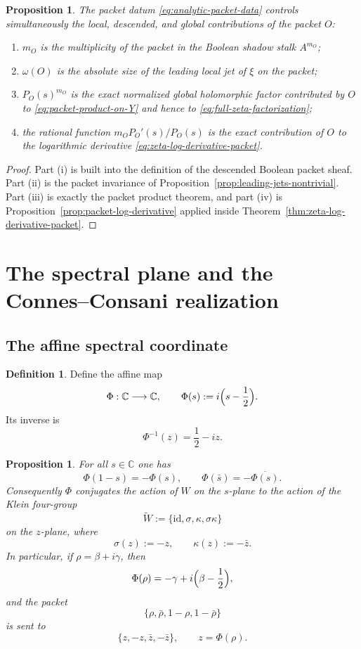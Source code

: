 \documentclass[11pt,a4paper]{article}
\numberwithin{equation}{section}
\newtheorem{proposition}[theorem]{Proposition}
\theoremstyle{definition}
\newtheorem{definition}[theorem]{Definition}
\theoremstyle{remark}
\newcommand{\CC}{\mathbb C}
\begin{document}
\begin{proposition}\label{prop:analytic-packet-data-complete}
The packet datum \eqref{eq:analytic-packet-data} controls simultaneously the local, descended, and global contributions of the packet $O$:
\begin{enumerate}[label=(\roman*)]
\item $m_O$ is the multiplicity of the packet in the Boolean shadow stalk $A^{m_O}$;
\item $\omega(O)$ is the absolute size of the leading local jet of $\xi$ on the packet;
\item $P_O(s)^{m_O}$ is the exact normalized global holomorphic factor contributed by $O$ to \eqref{eq:packet-product-on-Y} and hence to \eqref{eq:full-zeta-factorization};
\item the rational function $m_O P_O'(s)/P_O(s)$ is the exact contribution of $O$ to the logarithmic derivative \eqref{eq:zeta-log-derivative-packet}.
\end{enumerate}
\end{proposition}

\begin{proof}
Part (i) is built into the definition of the descended Boolean packet sheaf.  Part (ii) is the packet invariance of Proposition~\ref{prop:leading-jets-nontrivial}.  Part (iii) is exactly the packet product theorem, and part (iv) is Proposition~\ref{prop:packet-log-derivative} applied inside Theorem~\ref{thm:zeta-log-derivative-packet}.
\end{proof}

\section{The spectral plane and the Connes--Consani realization}

\subsection{The affine spectral coordinate}

\begin{definition}
Define the affine map
\[
\Phi:\CC\longrightarrow\CC,
\qquad
\Phi(s):=i\Bigl(s-\frac12\Bigr).
\]
Its inverse is
\[
\Phi^{-1}(z)=\frac12-iz.
\]
\end{definition}

\begin{proposition}\label{prop:Phi-symmetry}
For all $s\in\CC$ one has
\[
\Phi(1-s)=-\Phi(s),
\qquad
\Phi(\bar s)=-\overline{\Phi(s)}.
\]
Consequently $\Phi$ conjugates the action of $W$ on the $s$-plane to the action of the Klein four-group
\[
\widetilde W:=\{\mathrm{id},\sigma,\kappa,\sigma\kappa\}
\]
on the $z$-plane, where
\[
\sigma(z):=-z,
\qquad
\kappa(z):=-\bar z.
\]
In particular, if $\rho=\beta+i\gamma$, then
\[
\Phi(\rho)=-\gamma+i\Bigl(\beta-\frac12\Bigr),
\]
and the packet
\[
\{\rho,\bar\rho,1-\rho,1-\bar\rho\}
\]
is sent to
\[
\{z,-z,\bar z,-\bar z\},
\qquad z=\Phi(\rho).
\]
\end{proposition}
\end{document}
